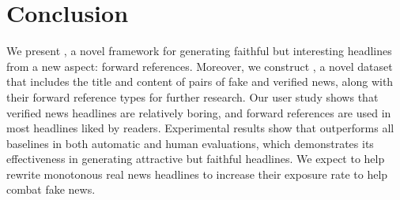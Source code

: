\section{Conclusion}
\label{sec-conclusion}

We present \modelname, a novel framework for generating faithful
but interesting headlines from a new aspect: forward references. Moreover, we
construct \dataset, a novel dataset that includes the title and content of
pairs of fake and verified news, along with their forward reference types for
further research. Our user study shows that verified news headlines are
relatively boring, and forward references are used in most headlines liked by readers.
Experimental results show that \modelname outperforms all
baselines in both automatic and human evaluations, which demonstrates its
effectiveness in generating attractive but faithful headlines. We expect
\modelname to help rewrite monotonous real news headlines to increase their
exposure rate to help combat fake news.




